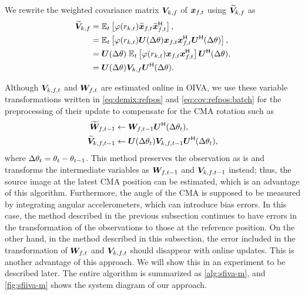 \documentclass[sip,biber]{now-journal}
\begin{document}
We rewrite the weighted covariance matrix ${\bm{V}} _{k,f}$ of $\Obs _{\ft}$ using $\widetilde{\bm{V}} _{k,f}$ as
\begin{align}
  \refpos{\cov} _{\src,\freq} &= \expct  _{\tframe} \left[\weight (\var _{\src,\tframe}) \refpos{\Obs} _{\ft} \refpos{\Obs} _{\ft} ^{\hermite}\right], \\
                     &= \expct  _{\tframe} \left[\weight (\var _{\src,\tframe}) \rotMat (\Delta\rotSpat) {\Obs} _{\ft} {\Obs} _{\ft} ^{\hermite} \rotMat ^{\hermite} (\Delta\rotSpat)\right], \\
                     &= \rotMat (\Delta\rotSpat)\; \expct  _{\tframe} \left[\weight (\var _{\src,\tframe}) {\Obs} _{\ft} {\Obs} _{\ft} ^{\hermite} \right] \rotMat ^{\hermite} (\Delta\rotSpat), \\
                     &= \rotMat (\Delta\rotSpat) {\cov} _{\src,\freq} \rotMat ^{\hermite} (\Delta\rotSpat). \label{eq:cov:refpos:batch}
\end{align}

Although $\cov _{\src,\ft}$ and $\Demix _{\ft}$ are estimated online in OIVA,
we use these variable transformations written in \eqref{eq:demix:refpos} and \eqref{eq:cov:refpos:batch} for the preprocessing of their update to compensate for the CMA rotation such as
\begin{align}
  \refpos{\Demix} _{\ft[-1]} &\gets \Demix _{\ft[-1]} \rotMat ^{\hermite} (\Delta \rotSpat _{\tframe}), \label{eq:sfiiva:demix} \\
  \refpos{\cov} _{\src,\ft[-1]} &\gets \rotMat (\Delta\rotSpat _{\tframe}) \cov _{\src,\ft[-1]} \rotMat ^{\hermite} (\Delta\rotSpat _{\tframe}), \label{eq:sfiiva:cov}
\end{align}
where $\Delta\theta _{t} = \theta _{t} - \theta _{t - 1}$.
This method preserves the observation as is and transforms the intermediate variables as $\Demix _{\ft[-1]}$ and $\cov _{\src,\ft[-1]}$ instead;
thus, the source image at the latest CMA position can be estimated, which is an advantage of this algorithm.
Furthermore, the angle of the CMA is supposed to be measured by integrating angular accelerometers, which can introduce bias errors.
In this case, the method described in the previous subsection continues to have errors in the transformation of the observations to those at the reference position.
On the other hand, in the method described in this subsection, the error included in the transformation of $\Demix _{\ft}$ and $\cov _{\src,\ft}$ should disappear with online updates.
This is another advantage of this approach. We will show this in an experiment to be described later.
The entire algorithm is summarized as \cref{alg:sfiva-m}, and \cref{fig:sfiiva-m} shows the system diagram of our approach.
\end{document}
